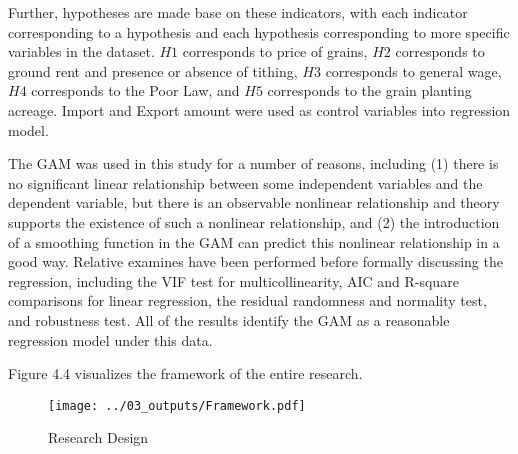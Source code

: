 Further, hypotheses are made base on these indicators, with each indicator corresponding to a hypothesis and each hypothesis corresponding to more specific variables in the dataset. $H1$ corresponds to price of grains, $H2$ corresponds to ground rent and presence or absence of tithing, $H3$ corresponds to general wage, $H4$ corresponds to the Poor Law, and $H5$ corresponds to the grain planting acreage. Import and Export amount were used as control variables into regression model.

The GAM was used in this study for a number of reasons, including (1) there is no significant linear relationship between some independent variables and the dependent variable, but there is an observable nonlinear relationship and theory supports the existence of such a nonlinear relationship, and (2) the introduction of a smoothing function in the GAM can predict this nonlinear relationship in a good way. Relative examines have been performed before formally discussing the regression, including the VIF test for multicollinearity, AIC and R-square comparisons for linear regression, the residual randomness and normality test, and robustness test. All of the results identify the GAM as a reasonable regression model under this data.

Figure 4.4 visualizes the framework of the entire research.

\begin{landscape}
    \begin{figure}[h]
        \centering
        \caption{Research Design}
        \texttt{[image: ../03\_outputs/Framework.pdf]}
    \end{figure}
\end{landscape}
